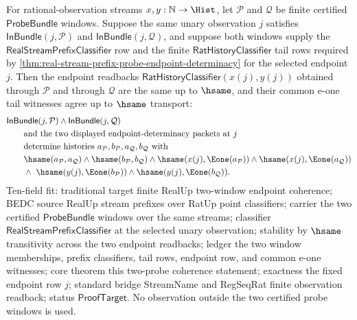 \begin{theorem}
\label{thm:real-stream-prefix-two-probe-endpoint-coherence}
For rational-observation streams $x,y:\mathbb{N}\to\Hist$, let
$\mathcal P$ and $\mathcal Q$ be finite certified $\mathsf{ProbeBundle}$
windows. Suppose the same unary observation $j$ satisfies
$\mathsf{InBundle}(j,\mathcal P)$ and $\mathsf{InBundle}(j,\mathcal Q)$, and
suppose both windows supply the $\mathsf{RealStreamPrefixClassifier}$ row and
the finite $\mathsf{RatHistoryClassifier}$ tail rows required by
\autoref{thm:real-stream-prefix-probe-endpoint-determinacy} for the selected
endpoint $j$. Then the endpoint readbacks
$\mathsf{RatHistoryClassifier}(x(j),y(j))$ obtained through $\mathcal P$ and
through $\mathcal Q$ are the same up to $\hsame$, and their common e-one tail
witnesses agree up to $\hsame$ transport:
$$
\begin{aligned}
&\mathsf{InBundle}(j,\mathcal P)\land
\mathsf{InBundle}(j,\mathcal Q) \\
&\qquad \text{and the two displayed endpoint-determinacy packets at } j \\
&\qquad \text{determine histories } a_{\mathcal P},b_{\mathcal P},
a_{\mathcal Q},b_{\mathcal Q} \text{ with} \\
&\qquad \hsame(a_{\mathcal P},a_{\mathcal Q})\land
\hsame(b_{\mathcal P},b_{\mathcal Q})\land
\hsame(x(j),\Eone(a_{\mathcal P}))\land
\hsame(x(j),\Eone(a_{\mathcal Q})) \\
&\qquad \land\ \hsame(y(j),\Eone(b_{\mathcal P}))\land
\hsame(y(j),\Eone(b_{\mathcal Q})).
\end{aligned}
$$
Ten-field fit: traditional target finite RealUp two-window endpoint coherence;
BEDC source RealUp stream prefixes over RatUp point classifiers; carrier the
two certified $\mathsf{ProbeBundle}$ windows over the same streams; classifier
$\mathsf{RealStreamPrefixClassifier}$ at the selected unary observation;
stability by $\hsame$ transitivity across the two endpoint readbacks; ledger
the two window memberships, prefix classifiers, tail rows, endpoint row, and
common e-one witnesses; core theorem this two-probe coherence statement;
exactness the fixed endpoint row $j$; standard bridge StreamName and RegSeqRat
finite observation readback; status $\mathsf{ProofTarget}$. No observation
outside the two certified probe windows is used.
\end{theorem}
